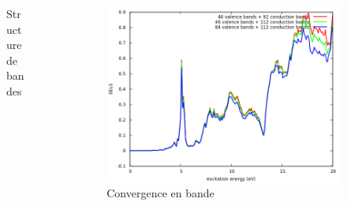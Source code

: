 \documentclass[french]{beamer}
\begin{document}
\begin{frame}
\begin{columns}
\begin{column}{\paperwidth-10pt}
\begin{figure}[!h]
    \caption{\centering Structure de bandes}\label{fig-band_3}
    \end{figure}
  \end{column}
  \begin{column}{\paperwidth-10pt}
    \begin{figure}[!h]
    \centering
    \includegraphics[width=\textwidth]{nbd_compare}
    \caption{Convergence en bande}\label{fig-cv_nbd_3}
    \end{figure}
  \end{column}
\end{columns}

\end{frame}
\end{document}
